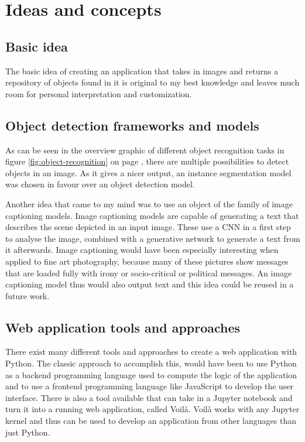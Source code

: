 \chapter{Ideas and concepts}

\section{Basic idea}

The basic idea of creating an application that takes in images and returns a repository of objects found in it is original to my best knowledge and leaves much room for personal interpretation and customization.

\section{Object detection frameworks and models}

As can be seen in the overview graphic of different object recognition tasks in figure \ref{fig:object-recognition} on page \pageref{fig:object-recognition}, there are multiple possibilities to detect objects in an image. As it gives a nicer output, an instance segmentation model was chosen in favour over an object detection model.

Another idea that came to my mind was to use an object of the family of image captioning models. Image captioning models are capable of generating a text that describes the scene depicted in an input image. These use a CNN in a first step to analyse the image, combined with a generative network to generate a text from it afterwards. Image captioning would have been especially interesting when applied to fine art photography, because many of these pictures show messages that are loaded fully with irony or socio-critical or political messages. An image captioning model thus would also output text and this idea could be reused in a future work.

\section{Web application tools and approaches}

There exist many different tools and approaches to create a web application with Python. The classic approach to accomplish this, would have been to use Python as a backend programming language used to compute the logic of the application and to use a frontend programming language like JavaScript to develop the user interface. There is also a tool available that can take in a Jupyter notebook and turn it into a running web application, called Voilà. Voilà works with any Jupyter kernel and thus can be used to develop an application from other languages than just Python.

